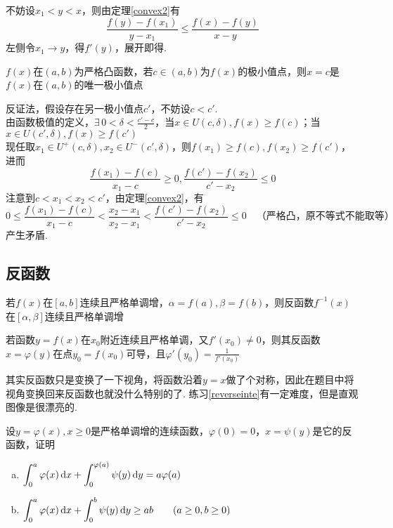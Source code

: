\begin{analysis}
不妨设$x_1<y<x$，则由定理\ref{convex2}有
\[\frac{f(y)-f(x_1)}{y-x_1}\leq\frac{f(x)-f(y)}{x-y}\]
左侧令$x_1\to y$，得$f'(y)$，展开即得.
\end{analysis}
\begin{theorem}
$f(x)$在$(a,b)$为严格凸函数，若$c\in(a,b)$为$f(x)$的极小值点，则$x=c$是$f(x)$在$(a,b)$的唯一极小值点
\end{theorem}
\begin{analysis}
反证法，假设存在另一极小值点$c'$，不妨设$c<c'$.\\
由函数极值的定义，$\displaystyle\exists\,0<\delta<\frac{c'-c}{2}$，当$x\in U(c,\delta),f(x)\geq f(c)$；当$x\in U(c',\delta),f(x)\geq f(c')$\\
现任取$x_1\in U^+(c,\delta),x_2\in U^-(c',\delta)$，则$f(x_1)\geq f(c),f(x_2)\geq f(c')$，进而
\[\frac{f(x_1)-f(c)}{x_1-c}\geq 0,\frac{f(c')-f(x_2)}{c'-x_2}\leq 0\]
注意到$c<x_1<x_2<c'$，由定理\ref{convex2}，有
\[0\leq\frac{f(x_1)-f(c)}{x_1-c}<\frac{x_2-x_1}{x_2-x_1}<\frac{f(c')-f(x_2)}{c'-x_2}\leq 0\quad\text{（严格凸，原不等式不能取等）}\]
产生矛盾.
\end{analysis}

\subsection{反函数}
\begin{theorem}
	若$f(x)$在$[a,b]$连续且严格单调增，$\alpha=f(a),\beta=f(b)$，则反函数$f^{-1}(x)$在$[\alpha,\beta]$连续且严格单调增
\end{theorem}
\begin{theorem}
若函数$y=f(x)$在$x_0$附近连续且严格单调，又$f'(x_0)\ne 0$，则其反函数$x=\varphi(y)$在点$y_0=f(x_0)$可导，且$\displaystyle\varphi'(y_0)=\frac{1}{f'(x_0)}$
\end{theorem}
\par 其实反函数只是变换了一下视角，将函数沿着$y=x$做了个对称，因此在题目中将视角变换回来反函数也就没什么特别的了. 练习\ref{reverseinte}有一定难度，但是直观图像是很漂亮的.
\begin{exercise}
\label{reverseinte}
设$y=\varphi(x),x\geq 0$是严格单调增的连续函数，$\varphi(0)=0$，$x=\psi(y)$是它的反函数，证明
\begin{enumerate}[(a)]
	\item $\displaystyle\int_0^a\varphi(x)\,\mathrm{d} x+\int_0^{\varphi(a)}\psi(y)\,\mathrm{d} y=a\varphi(a)$
	\item $\displaystyle\int_0^a\varphi(x)\,\mathrm{d} x+\int_0^b\psi(y)\,\mathrm{d} y\geq ab\qquad(a\geq 0,b\geq 0)$
\end{enumerate}
\end{exercise}


